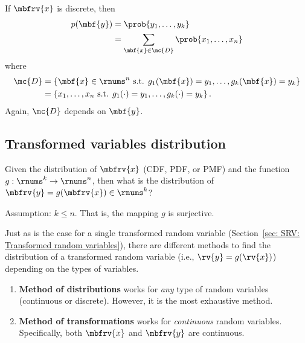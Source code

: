 If $\mbfrv{x}$ is discrete, then
\begin{align}
    p(\mbf{y}) &= \prob{y_{1},\ldots, y_{k}}\\
    &= \sum_{\mbf{x}\in\mc{D}}\prob{x_{1},\ldots,x_{n}}
\end{align}
where 
\begin{align}
    \mc{D} &=
    \left\{ \mbf{x}\in\rnums^{n} \text{ s.t. } g_{1}(\mbf{x})=y_{1},\ldots, g_{k}(\mbf{x})=y_{k}\right\}\\
    &= \left\{ x_{1},\ldots, x_{n} \text{ s.t. } g_{1}(\cdot)=y_{1},\ldots, g_{k}(\cdot)=y_{k}\right\}.
\end{align}
Again, $\mc{D}$ depends on $\mbf{y}$.

\subsection*{Transformed variables distribution}
Given the distribution of $\mbfrv{x}$ (CDF, PDF, or PMF) and the function $g:\rnums^{k}\to\rnums^{n}$, then what is the distribution of $\mbfrv{y}=g(\mbfrv{x})\in\rnums^{k}$?

Assumption: $k\leq n$. That is, the mapping $g$ is surjective.


Just as is the case for a single transformed random variable (Section~\ref{sec: SRV: Transformed random variables}), there are different methods to find the distribution of a transformed random variable (i.e., $\rv{y}=g(\rv{x})$) depending on the types of variables.
\begin{enumerate}
    \item \textbf{Method of distributions} works for \emph{any} type of random variables (continuous or discrete). However, it is the most exhaustive method.
    \item \textbf{Method of transformations} works for \emph{continuous} random variables. Specifically, both $\mbfrv{x}$ and $\mbfrv{y}$ are continuous.
\end{enumerate}

